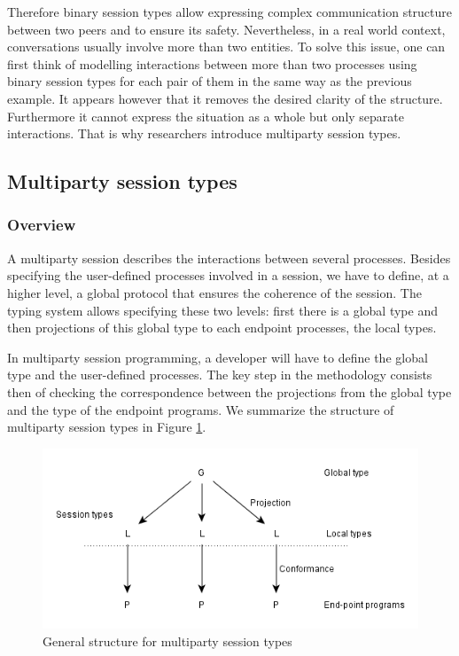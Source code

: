 \documentclass[a4paper,11pt,twoside]{report}
\begin{document}
Therefore binary session types allow expressing complex communication structure between two peers and to ensure its safety. Nevertheless, in a real world context, conversations usually involve more than two entities. To solve this issue, one can first think of modelling interactions between more than two processes using binary session types for each pair of them in the same way as the previous example. It appears however that it removes the desired clarity of the structure. Furthermore it cannot express the situation as a whole but only separate interactions. That is why researchers introduce multiparty session types.



\subsection{Multiparty session types}


\subsubsection{Overview}
A multiparty session describes the interactions between several processes. Besides specifying the user-defined processes involved in a session, we have to define, at a higher level, a global protocol that ensures the coherence of the session. The typing system allows specifying these two levels: first there is a global type and then projections of this global type to each endpoint processes, the local types. 

In multiparty session programming, a developer will have to define the global type and the user-defined processes. The key step in the methodology consists then of checking the correspondence between the projections from the global type and the type of the endpoint programs. We summarize the structure of multiparty session types in Figure \ref{fig:mpst}.

\begin{figure}[h]
\begin{center}
\includegraphics{mpst}
\caption{General structure for multiparty session types}\label{fig:mpst}
\end{center}
\end{figure}
\end{document}
